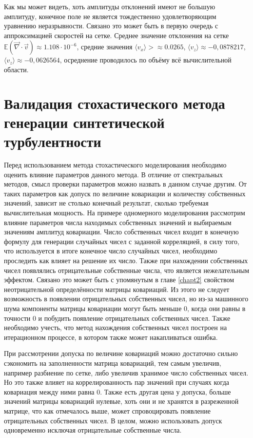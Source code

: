 Как мы может видеть, хоть амплитуды отклонений имеют не большую амплитуду, конечное поле не является тождественно удовлетворяющим уравнению неразрывности. Связано это может быть в первую очередь с аппроксимацией скоростей на сетке. Среднее значение отклонения на сетке $\mathbb{E}(\vec \nabla \cdot \vec{v}) \approx 1.108 \cdot 10^{-6}$, средние значения $\langle v_x \rangle> \approx 0.0265$, $\langle v_z \rangle \approx -0,0878217$, $\langle v_z \rangle \approx -0,0626564$, осреднение проводилось по объёму всё вычислительной области.

 
\chapter{Валидация стохастического метода генерации синтетической турбулентности} \label{chapt5}
Перед использованием метода стохастического моделирования необходимо оценить влияние параметров данного метода. В отличие от спектральных методов, смысл проверки параметров можно назвать в данном случае другим. От таких параметров как допуск по величине ковариации и количеству собственных значений, зависит не столько конечный результат, сколько требуемая вычислительная мощность. На примере одномерного моделирования рассмотрим влияние параметров числа находимых собственных значений и выбираемым значениям амплитуд ковариации. Число собственных чисел входит в конечную формулу для генерации случайных чисел с заданной корреляцией, в силу того, что используется в итоге конечное число случайных чисел, необходимо проследить как влияет на решение их число. Также при нахождении собственных чисел появлялись отрицательные собственные числа, что является нежелательным эффектом. Связано это может быть с упомянутым в главе \ref{chapt2} свойством неотрицательной определённости матрицы ковариаций. Из этого не следует возможность в появлении отрицательных собственных чисел, но из-за машинного шума компоненты матрицы ковариации могут быть меньше 0, когда они равны в точности 0 и побудить появление отрицательных собственных чисел. Также необходимо учесть, что метод нахождения собственных чисел построен на итерационном процессе, в котором также может накапливаться ошибка.

При рассмотрении допуска по величине ковариаций можно достаточно сильно сэкономить на заполненности матрица ковариаций, тем самым увеличив, например разбиение по сетке, либо увеличив хранимое число собственных чисел. Но это также влияет на коррелированность пар значений при случаях когда ковариация между ними равна 0. Также есть другая цена у допуска, больше значений матрицы ковариаций нулевые, хоть они и не хранятся в разреженной матрице, что как отмечалось выше, может спровоцировать появление отрицательных собственных чисел. В целом, можно использовать допуск одновременно исключая отрицательные собственные числа.

